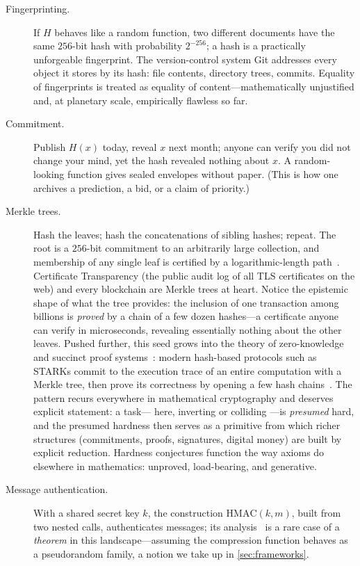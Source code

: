 \begin{description}
  \item[Fingerprinting.] If $H$ behaves like a random function, two
  different documents have the same $256$-bit hash with probability
  $2^{-256}$; a hash is a practically unforgeable fingerprint. The
  version-control system Git addresses every object it stores by its hash:
  file contents, directory trees, commits. Equality of fingerprints is
  treated as equality of content---mathematically unjustified and, at
  planetary scale, empirically flawless so far.

  \item[Commitment.] Publish $H(x)$ today, reveal $x$ next month; anyone
  can verify you did not change your mind, yet the hash revealed nothing
  about $x$. A random-looking function gives sealed envelopes without
  paper. (This is how one archives a prediction, a bid, or a claim of
  priority.)

  \item[Merkle trees.] Hash the leaves; hash the concatenations of sibling
  hashes; repeat. The root is a $256$-bit commitment to an arbitrarily
  large collection, and membership of any single leaf is certified by a
  logarithmic-length path~\citep{Merkle1988,Merkle1989}. Certificate Transparency
  (the public audit log of all TLS certificates on the web) and every
  blockchain are Merkle trees at heart. Notice the epistemic shape of
  what the tree provides: the inclusion of one transaction among
  billions is \emph{proved} by a chain of a few dozen hashes---a
  certificate anyone can verify in microseconds, revealing essentially
  nothing about the other leaves. Pushed further, this seed grows into
  the theory of zero-knowledge and succinct proof
  systems~\citep{GMR1989}: modern hash-based protocols such as STARKs
  commit to the execution trace of an entire computation with a Merkle
  tree, then prove its correctness by opening a few hash
  chains~\citep{BenSasson2018}. The pattern recurs everywhere in
  mathematical cryptography and deserves explicit statement: a task---%
  here, inverting or colliding \SHA{}---is \emph{presumed} hard, and the
  presumed hardness then serves as a primitive from which richer
  structures (commitments, proofs, signatures, digital money) are built
  by explicit reduction. Hardness conjectures function the way axioms do
  elsewhere in mathematics: unproved, load-bearing, and generative.

  \item[Message authentication.] With a shared secret key $k$, the
  construction $\mathrm{HMAC}(k, m)$, built from two nested \SHA{} calls,
  authenticates messages; its analysis~\citep{BCK1996} is a rare case of a
  \emph{theorem} in this landscape---assuming the compression function
  behaves as a pseudorandom family, a notion we take up in
  \cref{sec:frameworks}.


\end{description}
